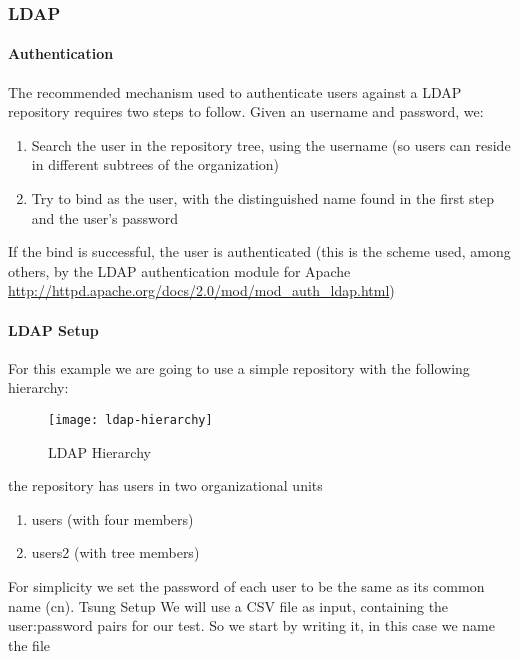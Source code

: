 \documentclass{TSUNG-en}
\begin{document}
\subsubsection{LDAP}
\label{sec:session:ldap}

\paragraph{Authentication}
The recommended mechanism used to authenticate users against a LDAP
repository requires two steps to follow. Given an username and
password, we:

\begin{enumerate}
\item Search the user in the repository tree, using the username (so users can reside in different subtrees of the organization)
\item Try to bind as the user, with the distinguished name found in the first step and the user's password
\end{enumerate}

If the bind is successful, the user is authenticated (this is the
scheme used, among others, by the LDAP authentication module for
Apache \url{http://httpd.apache.org/docs/2.0/mod/mod_auth_ldap.html})

\paragraph{LDAP Setup}
For this example we are going to use a simple repository with the following hierarchy:

\begin{figure}[htb]
  \begin{center}
    \texttt{[image: ldap-hierarchy]}
    \end{center}
      \caption{LDAP Hierarchy}
    \label{fig:ldap:hierarchy}
\end{figure}

the repository has users in two organizational units
\begin{enumerate}
\item users (with four members)
\item users2 (with tree members)
\end{enumerate}

For simplicity we set the password of each user to be  the same as its common name (cn).
Tsung Setup
We will use a CSV file as input, containing the user:password pairs
for our test. So we start by writing it, in this case we name the file 
\end{document}
